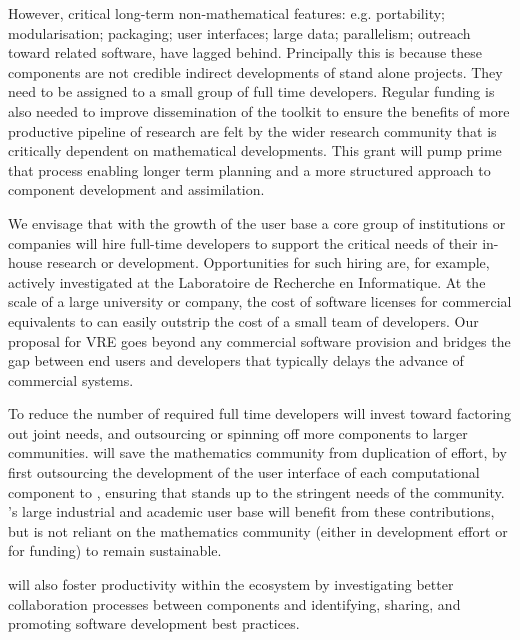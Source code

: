 \documentclass[noworkareas,deliverables,\classoptions]{euproposal}       %
\begin{document}
\begin{proposal}
However, critical long-term non-mathematical features:
e.g. portability; modularisation; packaging; user interfaces; large
data; parallelism; outreach toward related software, have lagged
behind. Principally this is because these components are not credible
indirect developments of stand alone projects. They need to be
assigned to a small group of full time developers. Regular funding is
also needed to improve dissemination of the toolkit to ensure the
benefits of more productive pipeline of research are felt by the wider
research community that is critically dependent on mathematical
developments. This grant will pump prime that process enabling longer
term planning and a more structured approach to component development
and assimilation.

We envisage that with the growth of the user base a core group of
institutions or companies will hire full-time developers to support
the critical needs of their in-house research or development.
Opportunities for such hiring are, for example, actively investigated
at the Laboratoire de Recherche en Informatique. At the scale of a
large university or company, the cost of software licenses for
commercial equivalents to \Sage can easily outstrip the cost of a
small team of developers. Our proposal for VRE goes beyond any
commercial software provision and bridges the gap between end users
and developers that typically delays the advance of commercial
systems.


To reduce the number of required full time developers \TheProject will
invest toward factoring out joint needs, and outsourcing or spinning
off more components to larger communities.  \TheProject will save the
mathematics community from duplication of effort, by first outsourcing
the development of the user interface of each computational component
to \Jupyter, ensuring that \Jupyter stands up to the stringent needs
of the community. \Jupyter's large industrial and academic user base
will benefit from these contributions, but is not reliant on the
mathematics community (either in development effort or for funding) to
remain sustainable.

\TheProject will also foster productivity within the ecosystem by
investigating better collaboration processes between components and
identifying, sharing, and promoting software development best
practices.


\end{proposal}
\end{document}
